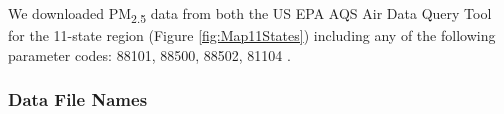 We downloaded PM\textsubscript{2.5} data from both the US EPA AQS Air Data Query Tool \citep{EPAAirData2017}  for the 11-state region (Figure \ref{fig:Map11States}) including any of the following parameter codes: 88101, 88500, 88502, 81104 \citep{EPANPM25Memo2017,EPANPM25Parameters2017,EPANAllParameters2017}. 







\subsubsection*{Data File Names}

